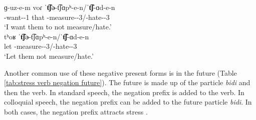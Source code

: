 \begin{exe}
	\ex \label{ex:stress:neg:present}
	\begin{xlist}
		\ex \gll ɡ-uz-e-m voɾ ˈ\textbf{t͡ʃə}-t͡ʃɑpʰ-e-n/ˈ\textbf{t͡ʃ}-ɑd-e-n
		\\
		{\ind}-want-{\thgloss}-1{\sg} that {\neggloss}-measure-{\thgloss}-3{\pl}/{\neggloss}-hate-{\thgloss}-3{\pl}
		\\
		\trans `I want them to not measure/hate.' \label{stress neg sub pres 1}
		\\ 
		\ex \gll tʰoʁ ˈ\textbf{t͡ʃə}-t͡ʃɑpʰ-e-n/ˈ\textbf{t͡ʃ}-ɑd-e-n
		\\
		let {\neggloss}-measure-{\thgloss}-3{\pl}/{\neggloss}-hate-{\thgloss}-3{\pl}
		\\
		\trans `Let them   not measure/hate.' \label{stress neg sub pres 2}
		\\ 
	\end{xlist}
\end{exe}

Another common use of these negative present forms is in the future (Table \ref{tab:stress verb negation future}). The future is made up of the particle \textit{bidi} and then the verb. In standard speech, the negation prefix is   added to the verb.  In colloquial speech, the negation prefix can be added to the future particle \textit{bidi}. In both cases, the negation prefix attracts stress \citep[339]{Adjarian-1971-LiakatarPhono}. 

\begin{table}[H]
	\centering
	\caption{Negation stress in the negated future}
	\label{tab:stress verb negation future}
	
	
	
\end{table}





